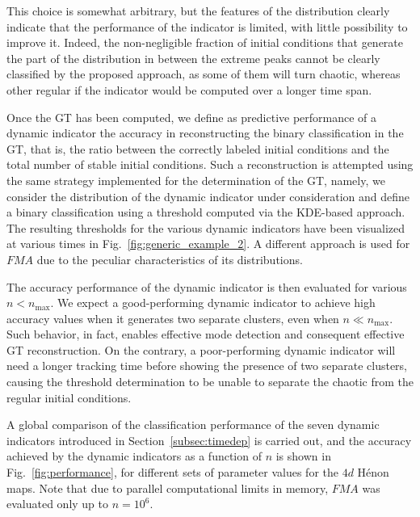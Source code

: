 This choice is somewhat arbitrary, but the features of the distribution clearly indicate that the performance of the indicator is limited, with little possibility to improve it. Indeed, the non-negligible fraction of initial conditions that generate the part of the distribution in between the extreme peaks cannot be clearly classified by the proposed approach, as some of them will turn chaotic, whereas other regular if the indicator would be computed over a longer time span.  

Once the GT has been computed, we define as predictive performance of a dynamic indicator the accuracy in reconstructing the binary classification in the GT, that is, the ratio between the correctly labeled initial conditions and the total number of stable initial conditions. Such a reconstruction is attempted using the same strategy implemented for the determination of the GT, namely, we consider the distribution of the dynamic indicator under consideration and define a binary classification using a threshold computed via the KDE-based approach. The resulting thresholds for the various dynamic indicators have been visualized at various times in Fig.~\ref{fig:generic_example_2}. A different approach is used for $FMA$ due to the peculiar characteristics of its distributions.

The accuracy performance of the dynamic indicator is then evaluated for various $n < n_{\text{max}}$. We expect a good-performing dynamic indicator to achieve high accuracy values when it generates two separate clusters, even when $n \ll n_{\text{max}}$. Such behavior, in fact, enables effective mode detection and consequent effective GT reconstruction. On the contrary, a poor-performing dynamic indicator will need a longer tracking time before showing the presence of two separate clusters, causing the threshold determination to be unable to separate the chaotic from the regular initial conditions.

A global comparison of the classification performance of the seven dynamic indicators introduced in Section~\ref{subsec:timedep} is carried out, and the accuracy achieved by the dynamic indicators as a function of $n$ is shown in Fig.~\ref{fig:performance}, for different sets of parameter values for the $4d$ Hénon maps. Note that due to parallel computational limits in memory, $FMA$ was evaluated only up to $n=10^6$.

